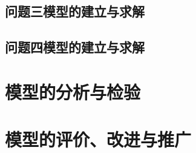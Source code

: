 \documentclass{cumcmthesis}
\begin{document}
\subsubsection{}

\subsection{问题三模型的建立与求解}
\subsection{问题四模型的建立与求解}
\section{模型的分析与检验}
\section{模型的评价、改进与推广}




\begin{appendices}
\end{appendices}
\end{document}
